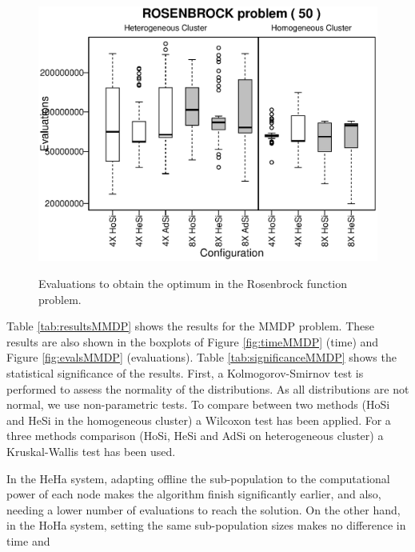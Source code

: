 \documentclass[final,1p,times]{elsarticle}
\begin{document}
\begin{figure}[ht]
{   \includegraphics[scale =0.5] {boxplots/ROSENBROCK_50_EVALS.eps}
   \label{fig:50evals}
 }
\caption{Evaluations to obtain the optimum in the Rosenbrock function problem.}
\label{fig:evalsROSENBROCK}
\end{figure}





Table \ref{tab:resultsMMDP} shows the results for the MMDP problem. These results are also shown in the boxplots of Figure \ref{fig:timeMMDP} (time) and Figure \ref{fig:evalsMMDP} (evaluations). Table \ref{tab:significanceMMDP} shows the statistical significance of the results. First, a Kolmogorov-Smirnov test is performed to assess the normality of the distributions. As all distributions are not normal, we use non-parametric tests. To compare between two methods (HoSi and HeSi in the homogeneous cluster) a Wilcoxon test has been applied. For a three methods comparison (HoSi, HeSi and AdSi on heterogeneous cluster) a Kruskal-Wallis test has been used. %

 In the HeHa system, adapting offline the sub-population to the computational
 power of each node makes the algorithm finish significantly earlier,
 and also, needing a lower number of evaluations to reach the solution. On the other hand, in the HoHa system,
 setting the same sub-population sizes makes no difference in time and
\end{document}
